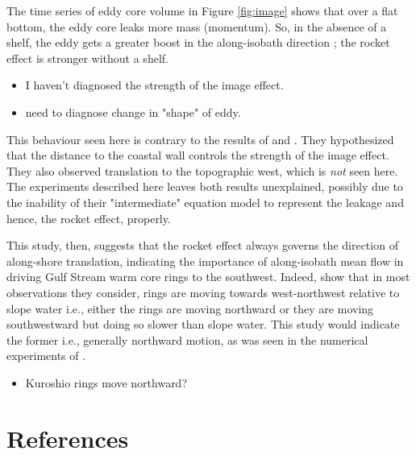 The time series of eddy core volume in Figure \ref{fig:image} shows that over a flat bottom, the eddy core leaks more mass (momentum). So, in the absence of a shelf, the eddy gets a greater boost in the along-isobath direction \citep{Shi1994}; the rocket effect is stronger without a shelf.

\begin{itemize}
\item I haven't diagnosed the strength of the image effect.
\item need to diagnose change in "shape" of eddy.
\end{itemize}

This behaviour seen here is contrary to the results of \citet{Frolov2004} and \citet{Sutyrin2010}. They hypothesized that the distance to the coastal wall controls the strength of the image effect. They also observed translation to the topographic west, which is \emph{not} seen here.  The experiments described here leaves both results unexplained, possibly due to the inability of their "intermediate" equation model to represent the leakage and hence, the rocket effect, properly.

This study, then, suggests that the rocket effect always governs the direction of along-shore translation, indicating the importance of along-isobath mean flow in driving Gulf Stream warm core rings to the southwest. Indeed, \citet{Cornillon1989} show that in most observations they consider, rings are moving towards west-northwest relative to slope water i.e., either the rings are moving northward or they are moving southwestward but doing so slower than slope water. This study would indicate the former i.e., generally northward motion, as was seen in the numerical experiments of \cite{Wei2009}.

\begin{itemize}
\item Kuroshio rings move northward?
\end{itemize}
\section{References}
\label{sec-8}

{}

